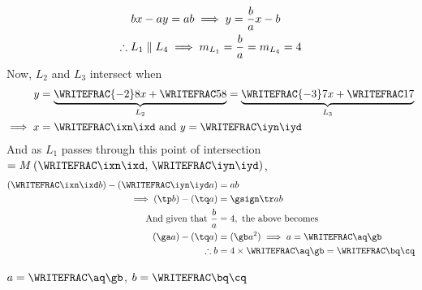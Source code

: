 \begin{solution}[\halfpage]
	\begin{align}
		bx - ay &= ab \implies y = \dfrac{b}{a}x -b \\
		\therefore L_1 \parallel L_4 &\implies m_{L_1} = \dfrac{b}{a} = m_{L_4} = 4 
	\end{align}
	Now, $L_2$ and $L_3$ intersect when 
	\begin{align}
		y &= \underbrace{\WRITEFRAC{-\va}\vb x  + \WRITEFRAC\vc\vb}_{L_2} 
		 = \underbrace{\WRITEFRAC{-\vd}\ve x + \WRITEFRAC\vf\ve}_{L_3} \\
		 \implies x &= \WRITEFRAC\ixn\ixd \text{ and } y = \WRITEFRAC\iyn\iyd
	\end{align}
	And as $L_1$ passes through this point of intersection 
	$ = M\left( \WRITEFRAC\ixn\ixd,\,\WRITEFRAC\iyn\iyd\right)$, 
	\begin{align}
		\left(\WRITEFRAC\ixn\ixd b\right) - \left( \WRITEFRAC\iyn\iyd a \right)&= ab \\
		\implies (\tp b) - (\tq a) &= \gsign\tr ab \\
		\text{And given that } \dfrac{b}{a} &= \vg, \text{ the above becomes } \\
		(\ga a) - (\tq a) &= (\gb a^2) \implies a = \WRITEFRAC\aq\gb \\
		\therefore b &= \vg\times\WRITEFRAC\aq\gb = \WRITEFRAC\bq\cq
	\end{align}
\end{solution}

\ifprintanswers
  \begin{codex}
    $a=\WRITEFRAC\aq\gb$, $b=\WRITEFRAC\bq\cq$
  \end{codex}
\fi

